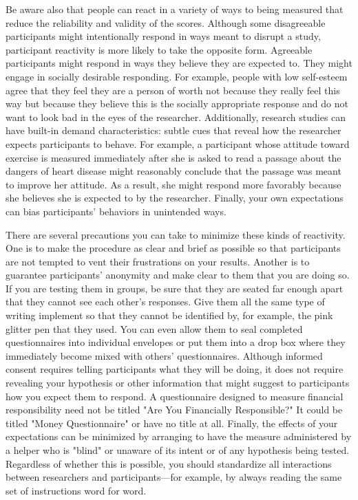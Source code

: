Be aware also that people can react in a variety of ways to being measured that reduce the reliability and validity of the scores. Although some disagreeable participants might intentionally respond in ways meant to disrupt a study, participant reactivity is more likely to take the opposite form. Agreeable participants might respond in ways they believe they are expected to. They might engage in socially desirable responding. For example, people with low self-esteem agree that they feel they are a person of worth not because they really feel this way but because they believe this is the socially appropriate response and do not want to look bad in the eyes of the researcher. Additionally, research studies can have built-in demand characteristics: subtle cues that reveal how the researcher expects participants to behave. For example, a participant whose attitude toward exercise is measured immediately after she is asked to read a passage about the dangers of heart disease might reasonably conclude that the passage was meant to improve her attitude. As a result, she might respond more favorably because she believes she is expected to by the researcher. Finally, your own expectations can bias participants' behaviors in unintended ways.

There are several precautions you can take to minimize these kinds of reactivity. One is to make the procedure as clear and brief as possible so that participants are not tempted to vent their frustrations on your results. Another is to guarantee participants' anonymity and make clear to them that you are doing so. If you are testing them in groups, be sure that they are seated far enough apart that they cannot see each other's responses. Give them all the same type of writing implement so that they cannot be identified by, for example, the pink glitter pen that they used. You can even allow them to seal completed questionnaires into individual envelopes or put them into a drop box where they immediately become mixed with others' questionnaires. Although informed consent requires telling participants what they will be doing, it does not require revealing your hypothesis or other information that might suggest to participants how you expect them to respond. A questionnaire designed to measure financial responsibility need not be titled "Are You Financially Responsible?" It could be titled "Money Questionnaire" or have no title at all. Finally, the effects of your expectations can be minimized by arranging to have the measure administered by a helper who is "blind" or unaware of its intent or of any hypothesis being tested. Regardless of
whether this is possible, you should standardize all interactions between researchers and participants—for example, by always reading the same set of instructions word for word.

